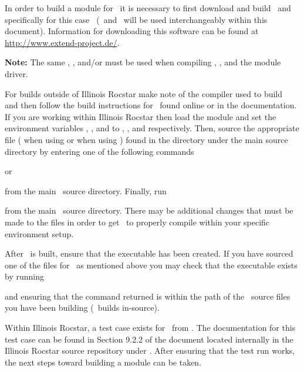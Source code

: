 
In order to build a module for \icofoam\, it is necessary to first download and build \openfoam\, and specifically for this case \openfoamex\, (\openfoam\, and \openfoamex\, will be used interchangeably within this document).  Information for downloading this software can be found at \url{http://www.extend-project.de/}.

\textbf{Note:} The same , , and/or  must be used when compiling , \openfoam, and the module driver. 


For builds outside of Illinois Rocstar make note of the compiler used to build \openfoam\, and then follow the build instructions for \openfoam\, found online or in the documentation. If you are working within Illinois Rocstar then load the  module and set the environment variables , , and  to , , and  respectively. Then, source the appropriate file ( when using  or  when using ) found in the  directory under the main  source directory by entering one of the following commands


or
 

from the main \openfoam\, source directory. Finally, run


from the main \openfoam\, source directory. There may be additional changes that must be made to the  files in order to get \openfoam\, to properly compile within your specific environment setup. 

After \openfoam\, is built, ensure that the  executable has been created. If you have sourced one of the files for \openfoam\, as mentioned above you may check that the  executable exists by running 


and ensuring that the  command returned is within the path of the \openfoam\, source files you have been building (\openfoam\, builds in-source).

Within Illinois Rocstar, a test case exists for \icofoam\, from \openfoamex. The documentation for this test case can be found in Section 9.2.2 of the  document located internally in the Illinois Rocstar source repository under . After ensuring that the test run works, the next steps toward building a module can be taken.
